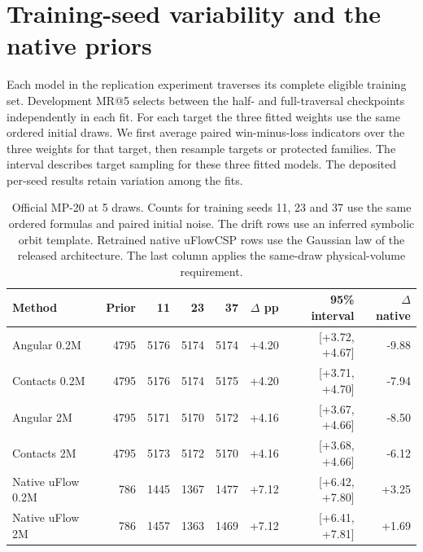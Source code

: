 \section{Training-seed variability and the native priors}

Each model in the replication experiment traverses its complete eligible training set. Development MR@5 selects between the half- and full-traversal checkpoints independently in each fit. For each target the three fitted weights use the same ordered initial draws. We first average paired win-minus-loss indicators over the three weights for that target, then resample targets or protected families. The interval describes target sampling for these three fitted models. The deposited per-seed results retain variation among the fits.

\begin{table}[!htbp]\centering\small\setlength{\tabcolsep}{3.6pt}
\caption{Official MP-20 at 5 draws. Counts for training seeds 11, 23 and 37 use the same ordered formulas and paired initial noise. The drift rows use an inferred symbolic orbit template. Retrained native uFlowCSP rows use the Gaussian law of the released architecture. The last column applies the same-draw physical-volume requirement.}
\begin{tabular}{lrrrrrrr}\hline
Method & Prior & 11 & 23 & 37 & $\Delta$ pp & 95\% interval & $\Delta$ native\\\hline
Angular 0.2M & 4795 & 5176 & 5174 & 5174 & +4.20 & [+3.72, +4.67] & -9.88\\
Contacts 0.2M & 4795 & 5176 & 5174 & 5175 & +4.20 & [+3.71, +4.70] & -7.94\\
Angular 2M & 4795 & 5171 & 5170 & 5172 & +4.16 & [+3.67, +4.66] & -8.50\\
Contacts 2M & 4795 & 5173 & 5172 & 5170 & +4.16 & [+3.68, +4.66] & -6.12\\
Native uFlow 0.2M & 786 & 1445 & 1367 & 1477 & +7.12 & [+6.42, +7.80] & +3.25\\
Native uFlow 2M & 786 & 1457 & 1363 & 1469 & +7.12 & [+6.41, +7.81] & +1.69\\
\hline\end{tabular}\end{table}

